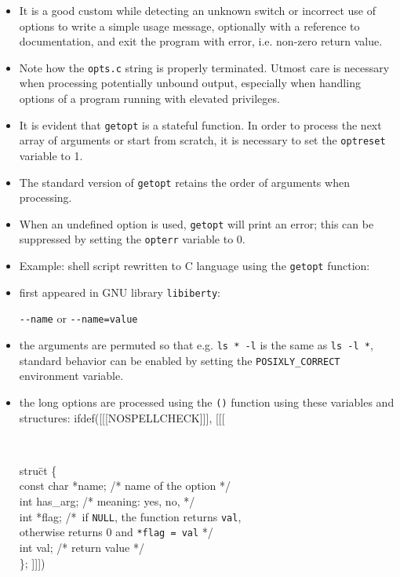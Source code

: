 \begin{itemize}
\item It is a good custom while detecting an unknown switch or incorrect use
of options to write a simple usage message, optionally with a reference to documentation,
and exit the program with error, i.e. non-zero return value.
\item Note how the \texttt{opts.c} string is properly terminated. Utmost care
is necessary when processing potentially unbound output, especially when
handling options of a program running with elevated privileges.
\item It is evident that \texttt{getopt} is a stateful function. In order to
process the next array of arguments or start from scratch, it is necessary to
set the \texttt{optreset} variable to 1.
\item The standard version of \texttt{getopt} retains the order of arguments when
processing.
\item When an undefined option is used, \texttt{getopt} will print an error;
this can be suppressed by setting the \texttt{opterr} variable to 0.
\item {} Example: shell script 
rewritten to C language using the \texttt{getopt} function:
\end{itemize}



\begin{slide}
\setlength{\baselineskip}{0.8\baselineskip}
\begin{itemize}
\item first appeared in GNU library \texttt{libiberty}:

\verb#--name# or \verb#--name=value#
\item the arguments are permuted so that e.g.
\verb#ls * -l# is the same as \verb#ls -l *#, standard behavior can be enabled
by setting the \verb#POSIXLY_CORRECT# environment variable.
\item the long options are processed using the \texttt{()}
function using these variables and structures:
ifdef([[[NOSPELLCHECK]]], [[[
{\tt
\begin{tabbing}
stru\=ct  \{\\
\>const char *name; \textrm{/* name of the option */} \\
\>int has\_arg; \textrm{/* meaning: yes, no,  */} \\
\>int *flag; \textrm{/*~}\=\textrm{if \texttt{NULL}, the function returns
\texttt{val}}, \\
\>\>\textrm{otherwise returns 0}
\textrm{and }\texttt{*flag = val}\textrm{ */} \\
\>int val; \textrm{/* return value */} \\
\};
]]])
\end{tabbing}}
\end{itemize}
\end{slide}

